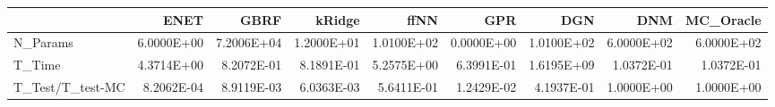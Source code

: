\begin{tabular}{lrrrrrrrr}
\toprule
{} &       ENET &       GBRF &     kRidge &       ffNN &        GPR &        DGN &        DNM &  MC\_Oracle \\
\midrule
N\_Params         & 6.0000E+00 & 7.2006E+04 & 1.2000E+01 & 1.0100E+02 & 0.0000E+00 & 1.0100E+02 & 6.0000E+02 & 6.0000E+02 \\
T\_Time           & 4.3714E+00 & 8.2072E-01 & 8.1891E-01 & 5.2575E+00 & 6.3991E-01 & 1.6195E+09 & 1.0372E-01 & 1.0372E-01 \\
T\_Test/T\_test-MC & 8.2062E-04 & 8.9119E-03 & 6.0363E-03 & 5.6411E-01 & 1.2429E-02 & 4.1937E-01 & 1.0000E+00 & 1.0000E+00 \\
\bottomrule
\end{tabular}
